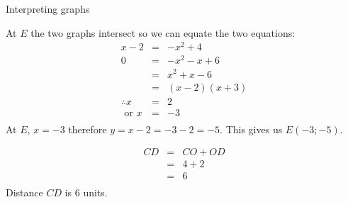 \begin{wex}{Interpreting graphs}
{
At $E$ the two  graphs intersect so we can equate the two equations:
\begin{equation*}
 \begin{array}{ccl}
  x-2&=& -x^{2}+4\\
 0&=& -x^{2}-x+6 \\
&=&x^{2}+x-6\\
&=&(x-2)(x+3)\\
\therefore x&=&2\\
\mbox{ or } x&=&-3\\
 \end{array}
\end{equation*}
At $E$, $x=-3$ therefore $y=x-2=-3-2=-5$. This gives us $E(-3;-5)$.


\begin{equation*}
 \begin{array}{ccl}
  CD&=&CO+OD\\
 &=& 4+2 \\
&=&6\\
 \end{array}
\end{equation*}
Distance $CD$ is $6$ units.
}

\end{wex}

